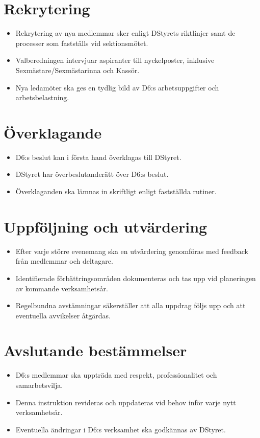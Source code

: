 \documentclass[a4paper]{dtekinstruktion}
\begin{document}
\section{Rekrytering}
\begin{itemize}
  \item Rekrytering av nya medlemmar sker enligt DStyrets riktlinjer samt de processer som fastställs vid sektionsmötet.
  \item Valberedningen intervjuar aspiranter till nyckelposter, inklusive Sexmästare/Sexmästarinna och Kassör.
  \item Nya ledamöter ska ges en tydlig bild av D6:s arbetsuppgifter och arbetsbelastning.
\end{itemize}

\section{Överklagande}
\begin{itemize}
  \item D6:s beslut kan i första hand överklagas till DStyret.
  \item DStyret har överbeslutanderätt över D6:s beslut.
  \item Överklaganden ska lämnas in skriftligt enligt fastställda rutiner.
\end{itemize}

\section{Uppföljning och utvärdering}
\begin{itemize}
  \item Efter varje större evenemang ska en utvärdering genomföras med feedback från medlemmar och deltagare.
  \item Identifierade förbättringsområden dokumenteras och tas upp vid planeringen av kommande verksamhetsår.
  \item Regelbundna avstämningar säkerställer att alla uppdrag följs upp och att eventuella avvikelser åtgärdas.
\end{itemize}

\section{Avslutande bestämmelser}
\begin{itemize}
  \item D6:s medlemmar ska uppträda med respekt, professionalitet och samarbetsvilja.
  \item Denna instruktion revideras och uppdateras vid behov inför varje nytt verksamhetsår.
  \item Eventuella ändringar i D6:s verksamhet ska godkännas av DStyret.
\end{itemize}
\end{document}
